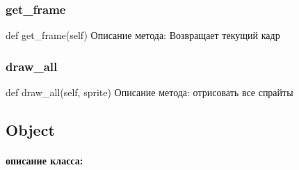 \subsubsection{get\_frame}
def get\_frame(self)
Описание метода: Возвращает текущий кадр
\subsubsection{draw\_all}
def draw\_all(self, sprite)
Описание метода: отрисовать все спрайты

\subsection{Object}
\paragraph{описание класса:}

